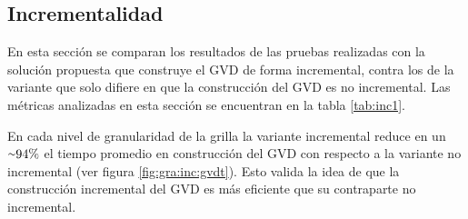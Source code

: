 
\subsection{Incrementalidad}\label{sec:exp:inc}
En esta sección se comparan los resultados de las pruebas realizadas con la
solución propuesta que construye el GVD de forma incremental, contra los de la 
variante que solo difiere en que la construcción del GVD es no incremental. Las
métricas analizadas en esta sección se encuentran en la tabla \ref{tab:inc1}.


En cada nivel de granularidad de la grilla la variante incremental reduce en un
${\smallsim}94\%$ el tiempo promedio en construcción del GVD con respecto a la
variante no incremental (ver figura \ref{fig:gra:inc:gvdt}). Esto valida la idea de que la construcción incremental
del GVD es más eficiente que su contraparte no incremental.

